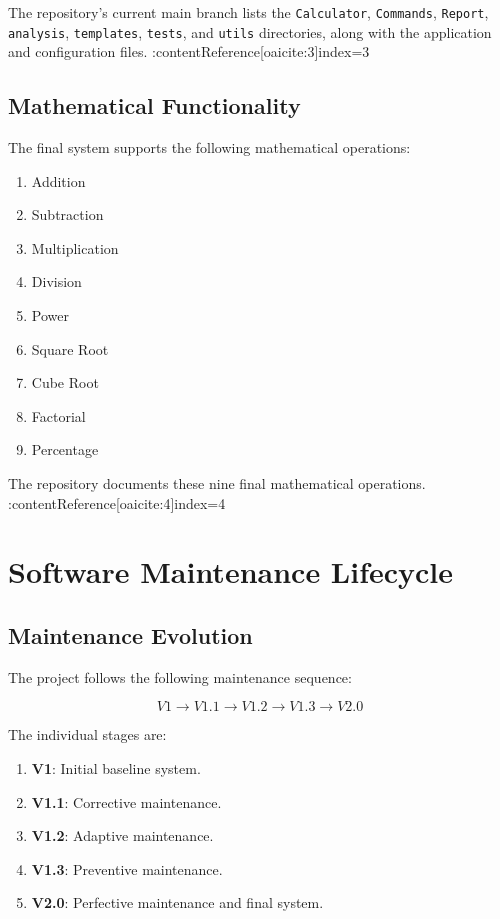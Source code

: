 \documentclass[12pt,a4paper]{report}
\begin{document}
The repository's current main branch lists the \texttt{Calculator},
\texttt{Commands}, \texttt{Report}, \texttt{analysis},
\texttt{templates}, \texttt{tests}, and \texttt{utils} directories,
along with the application and configuration files. :contentReference[oaicite:3]{index=3}

\section{Mathematical Functionality}

The final system supports the following mathematical operations:

\begin{enumerate}
    \item Addition
    \item Subtraction
    \item Multiplication
    \item Division
    \item Power
    \item Square Root
    \item Cube Root
    \item Factorial
    \item Percentage
\end{enumerate}

The repository documents these nine final mathematical operations. :contentReference[oaicite:4]{index=4}


\chapter{Software Maintenance Lifecycle}

\section{Maintenance Evolution}

The project follows the following maintenance sequence:

\[
V1
\rightarrow
V1.1
\rightarrow
V1.2
\rightarrow
V1.3
\rightarrow
V2.0
\]

The individual stages are:

\begin{enumerate}
    \item \textbf{V1}: Initial baseline system.
    \item \textbf{V1.1}: Corrective maintenance.
    \item \textbf{V1.2}: Adaptive maintenance.
    \item \textbf{V1.3}: Preventive maintenance.
    \item \textbf{V2.0}: Perfective maintenance and final system.
\end{enumerate}
\end{document}
